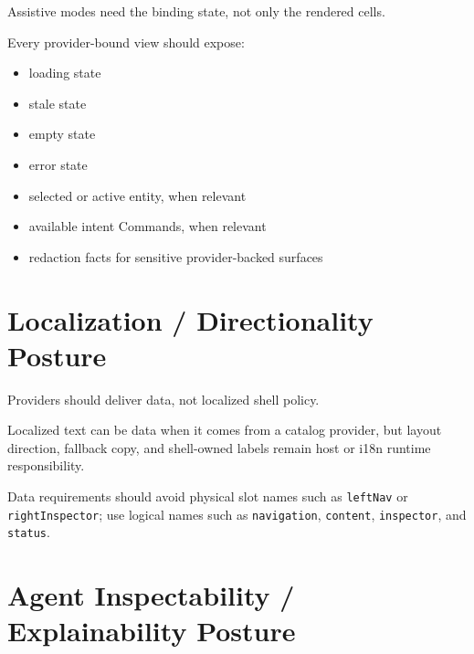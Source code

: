 Assistive modes need the binding state, not only the rendered cells.

Every provider-bound view should expose:

\begin{itemize}
\tightlist
\item
  loading state
\item
  stale state
\item
  empty state
\item
  error state
\item
  selected or active entity, when relevant
\item
  available intent Commands, when relevant
\item
  redaction facts for sensitive provider-backed surfaces
\end{itemize}

\section{Localization / Directionality Posture}\label{record-132-localization-directionality-posture}

Providers should deliver data, not localized shell policy.

Localized text can be data when it comes from a catalog provider, but layout direction, fallback copy, and shell-owned labels remain host or i18n runtime responsibility.

Data requirements should avoid physical slot names such as \texttt{l\allowbreak{}e\allowbreak{}f\allowbreak{}t\allowbreak{}N\allowbreak{}a\allowbreak{}v} or \texttt{r\allowbreak{}i\allowbreak{}g\allowbreak{}h\allowbreak{}t\allowbreak{}I\allowbreak{}n\allowbreak{}s\allowbreak{}p\allowbreak{}e\allowbreak{}c\allowbreak{}t\allowbreak{}o\allowbreak{}r}; use logical names such as \texttt{n\allowbreak{}a\allowbreak{}v\allowbreak{}i\allowbreak{}g\allowbreak{}a\allowbreak{}t\allowbreak{}i\allowbreak{}o\allowbreak{}n}, \texttt{c\allowbreak{}o\allowbreak{}n\allowbreak{}t\allowbreak{}e\allowbreak{}n\allowbreak{}t}, \texttt{i\allowbreak{}n\allowbreak{}s\allowbreak{}p\allowbreak{}e\allowbreak{}c\allowbreak{}t\allowbreak{}o\allowbreak{}r}, and \texttt{s\allowbreak{}t\allowbreak{}a\allowbreak{}t\allowbreak{}u\allowbreak{}s}.

\section{Agent Inspectability / Explainability Posture}\label{record-132-agent-inspectability-explainability-posture}

